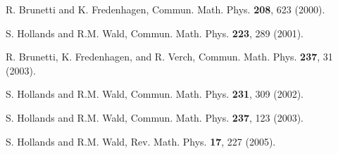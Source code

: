 \begin{thebibliography}{99}
 R. Brunetti and K. Fredenhagen,
Commun. Math. Phys. {\bf 208}, 623 (2000).

 S. Hollands and R.M. Wald,
Commun. Math. Phys. {\bf 223}, 289 (2001).

 R. Brunetti, K. Fredenhagen, and R. Verch,
Commun. Math. Phys. {\bf 237}, 31 (2003).

 S. Hollands and R.M. Wald,
Commun. Math. Phys. {\bf 231}, 309 (2002).

 S. Hollands and R.M. Wald,
Commun. Math. Phys. {\bf 237}, 123 (2003).

 S. Hollands and R.M. Wald,
Rev. Math. Phys. {\bf 17}, 227 (2005).

\end{thebibliography}
 
